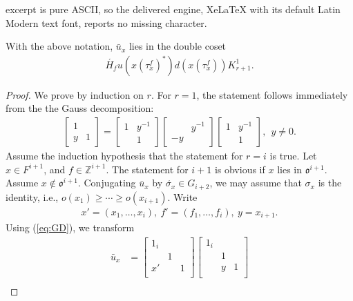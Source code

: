 \documentclass[10pt,a4paper]{amsart}
\newcommand\Z{{\mathbb{Z}}}
\newcommand\ac{\acute}
\newcommand\bu{\bar{u}}
\newcommand\oo{\mathfrak{o}}
\newcommand\s{\sigma}%
\begin{document}
excerpt is pure ASCII, so the delivered engine, XeLaTeX with its default Latin Modern text font, reports no missing character.
\begin{prop}\label{prop:LST}
With the above notation, $\bu_x$ lies in the double coset 
\begin{align*}
\ac{H_f} u(x(\tau_x^f)^*) d(x(\tau_x^f)) K^1_{r+1}.
\end{align*}  
\end{prop}

\begin{proof}
We prove by induction on $r$.
For $r = 1$, the statement follows immediately from the the Gauss decomposition: 
\begin{align}
\begin{bmatrix}
1&  \\
y &1
\end{bmatrix} = \begin{bmatrix}
1& y^{-1}  \\
&1
\end{bmatrix}
\begin{bmatrix}
& y^{-1} \\
-y &
\end{bmatrix}\begin{bmatrix}
1&y^{-1}  \\
&1
\end{bmatrix}, \ \ y \neq 0. \label{eq:GD}
\end{align} 
Assume the induction hypothesis that the statement for $r = i$ is true.
Let $x \in F^{i+1}$, and $f \in \Z^{i+1}$.
The statement for $i+1$ is obvious if $x$ lies in $\oo^{i+1}$.
Assume $x \not\in \oo^{i+1}$.
Conjugating $\bu_x$ by $\ac{\s_x} \in G_{i+2}$, we may assume that $\s_x$ is the identity, i.e., $o(x_1) \ge \cdots \ge o(x_{i+1})$.
Write
\begin{align*}
x' = (x_{1}, \ldots, x_i), \ f' = (f_{1}, \ldots, f_i), \ y = x_{i+1}.
\end{align*}
Using (\ref{eq:GD}), we transform
\begin{align*}
\bar{u}_x &= 
\begin{bmatrix}
1_{i} & & \\
 &1 &  \\
x' & &1  \\
\end{bmatrix}
\begin{bmatrix}
1_{i} & & \\
 &1 &  \\
 & y &1  \\
\end{bmatrix} \\

\end{align*}
\end{proof}
\end{document}
